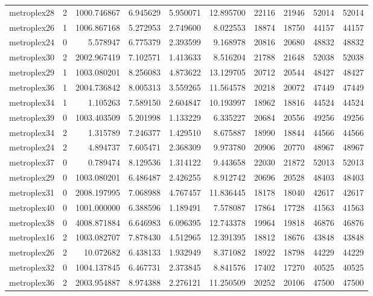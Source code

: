 \begin{longtable}{|l|r|r|r|r|r|r|r|r|r|}
metroplex28 & 2 & 1000.746867 & 6.945629 & 5.950071 & 12.895700 & 22116 & 21946 & 52014 & 52014 \\
metroplex26 & 1 & 1006.867168 & 5.272953 & 2.749600 & 8.022553 & 18874 & 18750 & 44157 & 44157 \\
metroplex24 & 0 & 5.578947 & 6.775379 & 2.393599 & 9.168978 & 20816 & 20680 & 48832 & 48832 \\
metroplex30 & 2 & 2002.967419 & 7.102571 & 1.413633 & 8.516204 & 21788 & 21648 & 52038 & 52038 \\
metroplex29 & 1 & 1003.080201 & 8.256083 & 4.873622 & 13.129705 & 20712 & 20544 & 48427 & 48427 \\
metroplex36 & 1 & 2004.736842 & 8.005313 & 3.559265 & 11.564578 & 20218 & 20072 & 47449 & 47449 \\
metroplex34 & 1 & 1.105263 & 7.589150 & 2.604847 & 10.193997 & 18962 & 18816 & 44524 & 44524 \\
metroplex39 & 0 & 1003.403509 & 5.201998 & 1.133229 & 6.335227 & 20684 & 20556 & 49256 & 49256 \\
metroplex34 & 2 & 1.315789 & 7.246377 & 1.429510 & 8.675887 & 18990 & 18844 & 44566 & 44566 \\
metroplex24 & 2 & 4.894737 & 7.605471 & 2.368309 & 9.973780 & 20906 & 20770 & 48967 & 48967 \\
metroplex37 & 0 & 0.789474 & 8.129536 & 1.314122 & 9.443658 & 22030 & 21872 & 52013 & 52013 \\
metroplex29 & 0 & 1003.080201 & 6.486487 & 2.426255 & 8.912742 & 20696 & 20528 & 48403 & 48403 \\
metroplex31 & 0 & 2008.197995 & 7.068988 & 4.767457 & 11.836445 & 18178 & 18040 & 42617 & 42617 \\
metroplex40 & 0 & 1001.000000 & 6.388596 & 1.189491 & 7.578087 & 17864 & 17728 & 41563 & 41563 \\
metroplex38 & 0 & 4008.871884 & 6.646983 & 6.096395 & 12.743378 & 19964 & 19818 & 46876 & 46876 \\
metroplex16 & 2 & 1003.082707 & 7.878430 & 4.512965 & 12.391395 & 18812 & 18676 & 43848 & 43848 \\
metroplex26 & 2 & 10.072682 & 6.438133 & 1.932949 & 8.371082 & 18922 & 18798 & 44229 & 44229 \\
metroplex32 & 0 & 1004.137845 & 6.467731 & 2.373845 & 8.841576 & 17402 & 17270 & 40525 & 40525 \\
metroplex36 & 2 & 2003.954887 & 8.974388 & 2.276121 & 11.250509 & 20252 & 20106 & 47500 & 47500 \\

\end{longtable}
